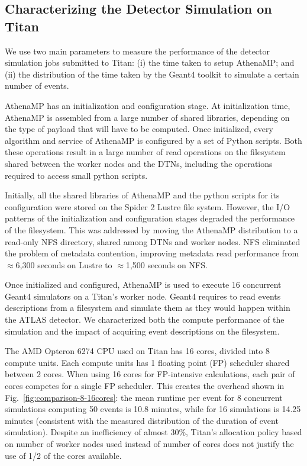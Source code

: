 \subsection{Characterizing the Detector Simulation on Titan}
\label{ssec:athenamp_titan}

We use two main parameters to measure the performance of the detector
simulation jobs submitted to Titan: (i) the time taken to setup AthenaMP; and
(ii) the distribution of the time taken by the Geant4 toolkit to simulate a
certain number of events.

AthenaMP has an initialization and configuration stage. At initialization
time, AthenaMP is assembled from a large number of shared libraries,
depending on the type of payload that will have to be computed. Once
initialized, every algorithm and service of AthenaMP is configured by a set
of Python scripts. Both these operations result in a large number of read
operations on the filesystem shared between the worker nodes and the DTNs,
including the operations required to access small python scripts.

Initially, all the shared libraries of AthenaMP and the python scripts for
its configuration were stored on the Spider 2 Lustre file system. However,
the I/O patterns of the initialization and configuration stages degraded the
performance of the filesystem. This was addressed by moving the AthenaMP
distribution to a read-only NFS directory, shared among DTNs and worker
nodes. NFS eliminated the problem of metadata contention, improving metadata
read performance from $\approx$6,300 seconds on Lustre to $\approx$1,500
seconds on NFS.

Once initialized and configured, AthenaMP is used to execute 16 concurrent
Geant4 simulators on a Titan's worker node. Geant4 requires to read events
descriptions from a filesystem and simulate them as they would happen within
the ATLAS detector. We characterized both the compute performance of the
simulation and the impact of acquiring event descriptions on the filesystem.

The AMD Opteron 6274 CPU used on Titan has 16 cores, divided into 8 compute
units. Each compute units has 1 floating point (FP) scheduler shared between
2 cores. When using 16 cores for FP-intensive calculations, each pair of
cores competes for a single FP scheduler. This creates the overhead shown in
Fig.~\ref{fig:comparison-8-16cores}: the mean runtime per event for 8
concurrent simulations computing 50 events is 10.8 minutes, while for 16
simulations is 14.25 minutes (consistent with the measured distribution of
the duration of event simulation). Despite an inefficiency of almost 30\%,
Titan's allocation policy based on number of worker nodes used instead of
number of cores does not justify the use of 1/2 of the cores available.

